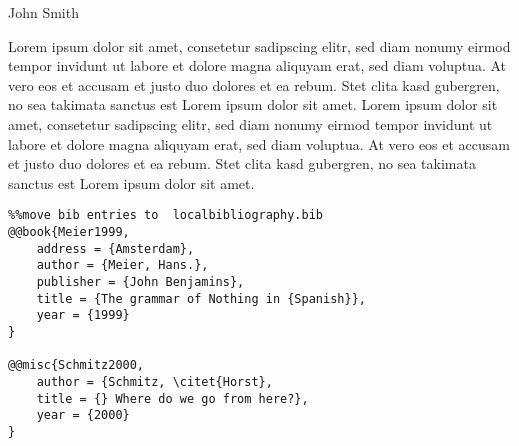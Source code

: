 \begin{styleEpigramauthor}
John Smith
\end{styleEpigramauthor}

Lorem ipsum dolor sit amet, consetetur sadipscing elitr, sed diam nonumy eirmod tempor invidunt ut labore et dolore magna aliquyam erat, sed diam voluptua. At vero eos et accusam et justo duo dolores et ea rebum. Stet clita kasd gubergren, no sea takimata sanctus est Lorem ipsum dolor sit amet. Lorem ipsum dolor sit amet, consetetur sadipscing elitr, sed diam nonumy eirmod tempor invidunt ut labore et dolore magna aliquyam erat, sed diam voluptua. At vero eos et accusam et justo duo dolores et ea rebum. Stet clita kasd gubergren, no sea takimata sanctus est Lorem ipsum dolor sit amet.
\begin{verbatim}%%move bib entries to  localbibliography.bib
@@book{Meier1999,
	address = {Amsterdam},
	author = {Meier, Hans.},
	publisher = {John Benjamins},
	title = {The grammar of Nothing in {Spanish}},
	year = {1999}
}

@@misc{Schmitz2000,
	author = {Schmitz, \citet{Horst},
	title = {} Where do we go from here?},
	year = {2000}
}

\end{verbatim}